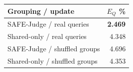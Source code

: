 \begin{tabular}{@{}lr@{}}
\toprule
Grouping / update & $E_Q$ \% \\
\midrule
SAFE-Judge / real queries & \textbf{2.469} \\
Shared-only / real queries & 4.348 \\
SAFE-Judge / shuffled groups & 4.696 \\
Shared-only / shuffled groups & 4.353 \\
\bottomrule
\end{tabular}
